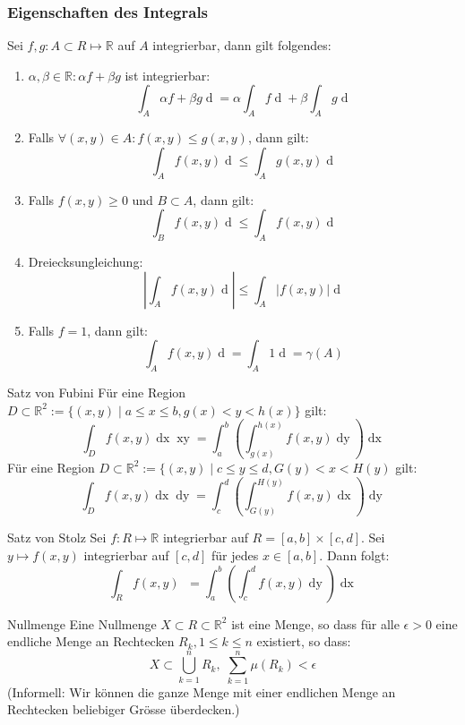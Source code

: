 \documentclass[a4paper,10pt]{article}
\def\R{\mathbb{R}}
\begin{document}
\subsubsection*{Eigenschaften des Integrals}
Sei \(f,g : A \subset R \mapsto \R\) auf \(A\) integrierbar, dann gilt folgendes:
\begin{enumerate}
  \item \(\alpha, \beta \in \R: \alpha f + \beta g\) ist integrierbar:
  \[\int_A \alpha f + \beta g \mathop{d(x,y)} = \alpha \int_A f \mathop{d(x,y)} + \beta \int_A g \mathop{d(x,y)}\]
  \item Falls \(\forall (x,y) \in A: f(x,y) \le g(x,y)\), dann gilt:
  \[\int_A f(x,y) \mathop{d(x,y)} \le \int_A g(x,y) \mathop{d(x,y)}\]
  \item Falls \(f(x,y) \ge 0\) und \(B \subset A\), dann gilt:
  \[\int_B f(x,y) \mathop{d(x,y)} \le \int_A f(x,y) \mathop{d(x,y)}\]
  \item Dreiecksungleichung:
    \[\left| \int_A f(x,y) \mathop{d(x,y)}\right| \le \int_A \left|f(x,y)\right| \mathop{d(x,y)}\]
  \item Falls \(f = 1\), dann gilt:
  \[\int_A f(x,y) \mathop{d(x,y)} = \int_A 1 \mathop{d(x,y)} = \gamma(A)\]
\end{enumerate}


\begin{mainbox}{Satz von Fubini}
  Für eine Region \(D \subset \R^2 := \{\left(x,y\right) \mid a \le x \le b, g(x) < y < h(x)\}\) gilt:
  \[\int_D f(x,y)\mathop{dx} \mathop{xy} = \int_a^b \left(\int_{g(x)}^{h(x)} f(x,y) \mathop{dy}\right)\mathop{dx}\]
  Für eine Region \(D \subset \R^2 := \{ \left(x,y\right) \mid c \le y \le d, G(y) < x < H(y)\) gilt:
  \[\int_D f(x,y) \mathop{dx} \mathop{dy} = \int_c^d \left(\int_{G(y)}^{H(y)} f(x,y)\mathop{dx}\right) \mathop{dy}\]
\end{mainbox}
\begin{subbox}{Satz von Stolz}
  Sei \(f: R \mapsto \R\) integrierbar auf \(R = \left[a,b\right] \times \left[c,d\right]\). Sei \(y \mapsto f(x,y)\) integrierbar auf \(\left[c,d\right]\) für jedes \(x \in \left[a,b\right]\). Dann folgt:
  \[\int_R f(x,y) \mathop(d(x,y)) = \int_a^b \left(\int_c^d f(x,y) \mathop{dy}\right) \mathop{dx}\]
\end{subbox}
\begin{mainbox}{Nullmenge}
  Eine Nullmenge \(X \subset R \subset \R^2\) ist eine Menge, so dass für alle \(\epsilon > 0\) eine endliche Menge an Rechtecken \(R_k, 1 \le k \le n\) existiert, so dass:
  \[X \subset \bigcup_{k = 1}^n R_k, \; \sum_{k = 1}^n \mu (R_k) < \epsilon\]
  (Informell: Wir können die ganze Menge mit einer endlichen Menge an Rechtecken beliebiger Grösse überdecken.)
\end{mainbox}
\end{document}
